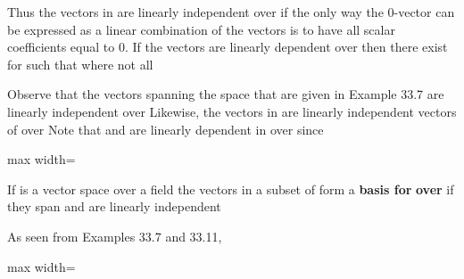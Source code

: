 \documentclass[11pt,oneside]{article}
\begin{document}
\begin{BookBody}

Thus the vectors in  are linearly independent over  if the only way the 0-vector can be expressed as a linear combination of the vectors  is to have all scalar coefficients equal to 0. If the vectors are linearly dependent over  then there exist  for  such that  where not all 

 Observe that the vectors spanning the space  that are given in Example 33.7 are linearly independent over  Likewise, the vectors in  are linearly independent vectors of  over  Note that  and  are linearly dependent in  over  since

\begin{center}\begin{adjustbox}{max width=\linewidth}\end{adjustbox}\end{center} \BookEnd{\blacktriangle}

 If  is a vector space over a field  the vectors in a subset  of  form a \textbf{basis for}  \textbf{over}  if they span  and are linearly independent\BookEnd{\blacksquare}

 As seen from Examples 33.7 and 33.11,

\begin{center}\begin{adjustbox}{max width=\linewidth}\end{adjustbox}\end{center}


\end{BookBody}
\end{document}
